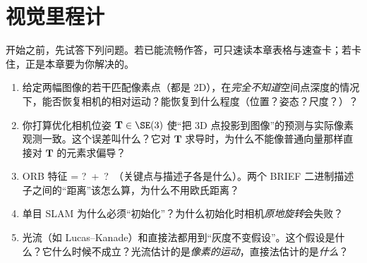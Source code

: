 \chapter{视觉里程计}
\label{ch:vo}


\begin{practice}[前置自测]
开始之前，先试答下列问题。若已能流畅作答，可只速读本章表格与速查卡；若卡住，正是本章要为你解决的。
\begin{enumerate}
  \item 给定两幅图像的若干匹配像素点（都是 2D），在\emph{完全不知道}空间点深度的情况下，能否恢复相机的相对运动？能恢复到什么程度（位置？姿态？尺度？）？
  \item 你打算优化相机位姿 $\mathbf{T}\in\SE(3)$ 使“把 3D 点投影到图像”的预测与实际像素观测一致。这个误差叫什么？它对 $\mathbf{T}$ 求导时，为什么不能像普通向量那样直接对 $\mathbf{T}$ 的元素求偏导？
  \item ORB 特征 = ?\ +\ ?\ （关键点与描述子各是什么）。两个 BRIEF 二进制描述子之间的“距离”该怎么算，为什么不用欧氏距离？
  \item 单目 SLAM 为什么必须“初始化”？为什么初始化时相机\emph{原地旋转}会失败？
  \item 光流（如 Lucas--Kanade）和直接法都用到“灰度不变假设”。这个假设是什么？它什么时候不成立？光流估计的是\emph{像素的运动}，直接法估计的是\emph{什么}？
\end{enumerate}
\end{practice}

